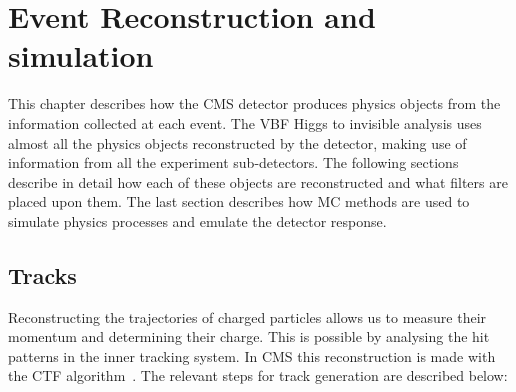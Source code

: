 \chapter{Event Reconstruction and simulation}
\label{CHAPTER:EventReconstructionAndSimulation}



This chapter describes how the \gls{CMS} detector produces physics objects from the information collected at each event. The \gls{VBF} Higgs to invisible analysis uses almost all the physics objects reconstructed by the detector, making use of information from all the experiment sub-detectors. The following sections describe in detail how each of these objects are reconstructed and what filters are placed upon them. The last section describes how \gls{MC} methods are used to simulate physics processes and emulate the detector response.

\section{Tracks}
\label{SECTION:EventReconstructionAndSimulation_Tracks}


Reconstructing the trajectories of charged particles allows us to measure their momentum and determining their charge. This is possible by analysing the hit patterns in the inner tracking system. In \gls{CMS} this reconstruction is made with the \gls{CTF} algorithm~\cite{ARTICLE:CMSTrackReconstruction}. The relevant steps for track generation are described below:

